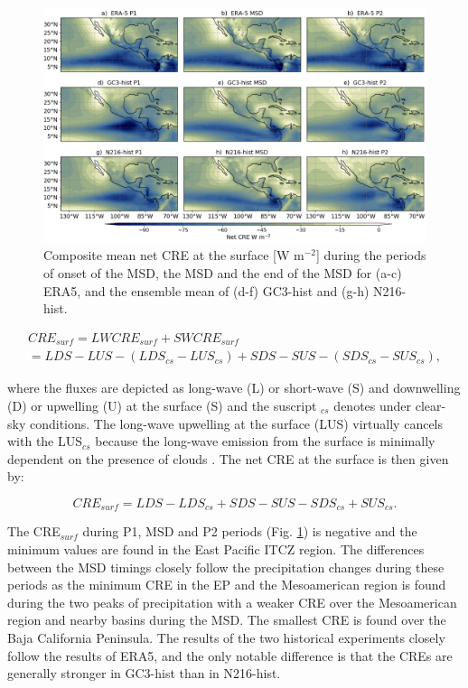 \begin{figure}[b!]
\includegraphics[width=\linewidth]{figures/fig4_creclim_3.png}
\caption[Composites of cloud radiative effects]{Composite mean net CRE at the surface [W m$^{-2}$] during the periods of onset of the MSD, the MSD and the end of the MSD for (a-c) ERA5, and the ensemble mean of (d-f) GC3-hist and (g-h) N216-hist.}
\label{fig:cre_comp}
\end{figure}

\begin{multline}
CRE_{surf}=LW CRE_{surf} +SW CRE_{surf} \\ = LDS-LUS -(LDS_{cs}-LUS_{cs})+SDS-SUS-(SDS_{cs}-SUS_{cs}),
\end{multline}

\noindent where the fluxes are depicted as long-wave (L) or short-wave (S) and downwelling (D) or upwelling (U) at the surface (S) and the suscript $_{cs}$ denotes under clear-sky conditions. The long-wave upwelling at the surface (LUS) virtually cancels with the LUS$_{cs}$ because the long-wave emission from the surface is minimally dependent on the presence of clouds \citep{allan2011}. The net CRE at the surface is then given by:

\begin{equation}
CRE_{surf}=  LDS-LDS_{cs}+SDS-SUS-SDS_{cs}+SUS_{cs}.
\end{equation}

The CRE$_{surf}$ during P1, MSD and P2 periods (Fig. \ref{fig:cre_comp}) is negative  and the minimum values are found in the East Pacific ITCZ region. The differences between the MSD timings closely follow the precipitation changes during these periods as the minimum CRE in the EP and the Mesoamerican region is found during the two peaks of precipitation with a weaker CRE over the Mesoamerican region and nearby basins during the MSD. The smallest CRE is found over the Baja California Peninsula. 
The results of the two historical experiments closely follow the results of ERA5, and the only notable difference is that the CREs are generally stronger in GC3-hist than in N216-hist.

